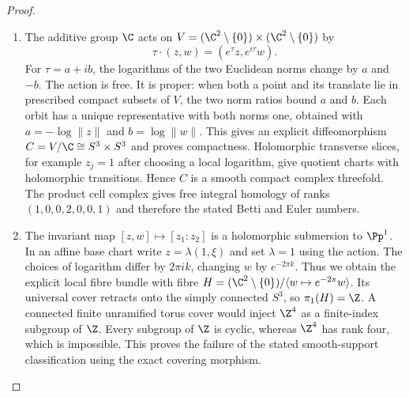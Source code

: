 \begin{proof}

\begin{enumerate}[label={$\langle1\rangle$\arabic*.},leftmargin=*]
\item The additive group $\C$ acts on
$V=(\C^2\setminus\{0\})\times(\C^2\setminus\{0\})$ by
\[
 \tau\cdot(z,w)=(e^\tau z,e^{i\tau}w).
\]
For $\tau=a+ib$, the logarithms of the two Euclidean norms change
by $a$ and $-b$. The action is free. It is proper: when both a
point and its translate lie in prescribed compact subsets of $V$,
the two norm ratios bound $a$ and $b$. Each orbit has a unique
representative with both norms one, obtained with
$a=-\log\|z\|$ and $b=\log\|w\|$. This gives an explicit
diffeomorphism $C=V/\C\cong S^3\times S^3$ and proves compactness.
Holomorphic transverse slices, for example $z_j=1$ after choosing
a local logarithm, give quotient charts with holomorphic
transitions. Hence $C$ is a smooth compact complex threefold.
The product cell complex gives free integral homology of ranks
$(1,0,0,2,0,0,1)$ and therefore the stated Betti and Euler numbers.

\item The invariant map $[z,w]\mapsto[z_1:z_2]$ is a holomorphic
submersion to $\Pp^1$. In an affine base chart write
$z=\lambda(1,\xi)$ and set $\lambda=1$ using the action.
The choices of logarithm differ by $2\pi ik$, changing $w$ by
$e^{-2\pi k}$. Thus we obtain the explicit local fibre bundle
with fibre
$H=(\C^2\setminus\{0\})/\langle w\mapsto e^{-2\pi}w\rangle$.
Its universal cover retracts onto the simply connected $S^3$, so
$\pi_1(H)=\Z$. A connected finite unramified torus cover would
inject $\Z^4$ as a finite-index subgroup of $\Z$. Every subgroup
of $\Z$ is cyclic, whereas $\Z^4$ has rank four, which is
impossible. This proves the failure of the stated smooth-support
classification using the exact covering morphism.

\end{enumerate}
\end{proof}
